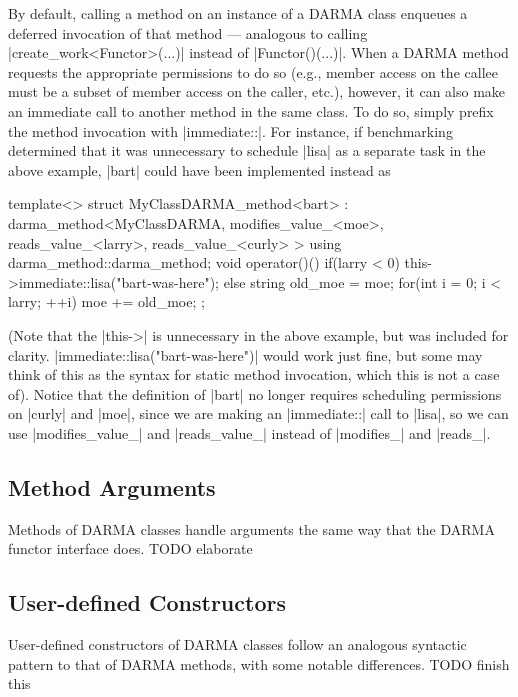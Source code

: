 By default, calling a method on an instance of a DARMA class enqueues a deferred
invocation of that method --- analogous to calling |create_work<Functor>(...)|
instead of |Functor()(...)|.  When a DARMA method requests the appropriate
permissions to do so (e.g., member access on the callee must be a subset of
member access on the caller, etc.), however, it can also make an immediate call
to another method in the same class.  To do so, simply prefix the method
invocation with |immediate::|.  For instance, if benchmarking determined that
it was unnecessary to schedule |lisa| as a separate task in the above example,
|bart| could have been implemented instead as
\begin{CppCodeNumb}
template<>
struct MyClassDARMA_method<bart>
  : darma_method<MyClassDARMA,
      modifies_value_<moe>,
      reads_value_<larry>,
      reads_value_<curly>
    >
{
  using darma_method::darma_method;
  void operator()() {
    if(larry < 0) this->immediate::lisa("bart-was-here");
    else {
      string old_moe = moe;
      for(int i = 0; i < larry; ++i) moe += old_moe;
    }
  }
};
\end{CppCodeNumb}
(Note that the |this->| is unnecessary in the above example, but was included
for clarity.  |immediate::lisa("bart-was-here")| would work just fine, but
some may think of this as the syntax for static method invocation, which this
is not a case of).  Notice that the definition of |bart| no longer requires
scheduling permissions on |curly| and |moe|, since we are making an
|immediate::| call to |lisa|, so we can use |modifies_value_| and |reads_value_|
instead of |modifies_| and |reads_|.

\subsection{Method Arguments}

Methods of DARMA classes handle arguments the same way that the DARMA functor
interface does.  TODO elaborate

\subsection{User-defined Constructors}

User-defined constructors of DARMA classes follow an analogous syntactic pattern
to that of DARMA methods, with some notable differences.  TODO finish this

\lstDeleteShortInline{\|}

 








